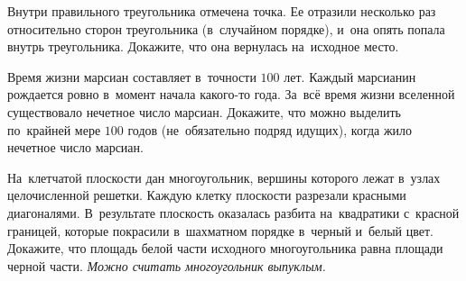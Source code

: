 \begin{problems}
\item
Внутри правильного треугольника отмечена точка.
Ее отразили несколько раз относительно сторон треугольника
(в~случайном порядке), и~она опять попала внутрь треугольника.
Докажите, что она вернулась на~исходное место.


\item
Время жизни марсиан составляет в~точности $100$ лет.
Каждый марсианин рождается ровно в~момент начала какого-то года.
За~всё время жизни вселенной существовало нечетное число марсиан.
Докажите, что можно выделить по~крайней мере $100$ годов
(не~обязательно подряд идущих), когда жило нечетное число марсиан.


\item
На~клетчатой плоскости дан многоугольник, вершины которого лежат в~узлах
целочисленной решетки.
Каждую клетку плоскости разрезали красными диагоналями.
В~результате плоскость оказалась разбита на~квадратики с~красной границей,
которые покрасили в~шахматном порядке в~черный и~белый цвет.
Докажите, что площадь белой части исходного многоугольника равна площади черной
части.
\emph{Можно считать многоугольник выпуклым.}



\end{problems}

